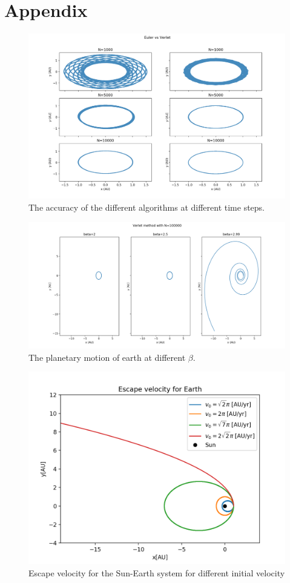 \documentclass{article}
\begin{document}
\clearpage
\appendix \section{Appendix} %

\begin{figure}[H]
	\centering
	\includegraphics[width=120mm]{Acc}
	\caption{The accuracy of the different algorithms at different time steps.}
	\label{fig:Acc}
\end{figure}


\begin{figure}[H]
	\centering
	\includegraphics[width=120mm]{Force_beta}
	\caption{The planetary motion of earth at different $\beta$.}
	\label{fig:Force_beta}
\end{figure}


\begin{figure}[H]
	\centering
	\includegraphics[width=120mm]{esc_vel_plot.png}
	\caption{Escape velocity for the Sun-Earth system for different initial velocity}
	\label{fig:esc}
\end{figure}
\end{document}
